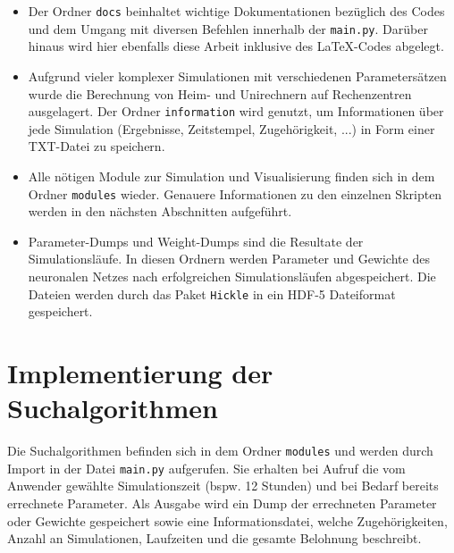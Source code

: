	\begin{minipage}{0.65\textwidth}
		\begin{itemize}
			\item Der Ordner \texttt{docs} beinhaltet wichtige Dokumentationen bezüglich des Codes und dem Umgang mit diversen Befehlen innerhalb der \texttt{main.py}. Darüber hinaus wird hier ebenfalls diese Arbeit inklusive des \LaTeX-Codes abgelegt.
			\item Aufgrund vieler komplexer Simulationen mit verschiedenen Parametersätzen wurde die Berechnung von Heim- und Unirechnern auf Rechenzentren ausgelagert. Der Ordner \texttt{information} wird genutzt, um Informationen über jede Simulation (Ergebnisse, Zeitstempel, Zugehörigkeit, ...) in Form einer TXT-Datei zu speichern.
			\item Alle nötigen Module zur Simulation und Visualisierung finden sich in dem Ordner \texttt{modules} wieder. Genauere Informationen zu den einzelnen Skripten werden in den nächsten Abschnitten aufgeführt.
			\item Parameter-Dumps und Weight-Dumps sind die Resultate der Simulationsläufe. In diesen Ordnern werden Parameter und Gewichte des neuronalen Netzes nach erfolgreichen Simulationsläufen abgespeichert. Die Dateien werden durch das Paket \texttt{Hickle} in ein HDF-5 Dateiformat \cite{hdf5} gespeichert.
		\end{itemize}		
	\end{minipage}
	
	
		
\section{Implementierung der Suchalgorithmen}
\label{sec:imp_search}
	Die Suchalgorithmen befinden sich in dem Ordner \texttt{modules} und werden durch Import in der Datei \texttt{main.py} aufgerufen. Sie erhalten bei Aufruf die vom Anwender gewählte Simulationszeit (bspw. 12 Stunden) und bei Bedarf bereits errechnete Parameter. Als Ausgabe wird ein Dump der errechneten Parameter oder Gewichte gespeichert sowie eine Informationsdatei, welche Zugehörigkeiten, Anzahl an Simulationen, Laufzeiten und die gesamte Belohnung beschreibt. 
	
